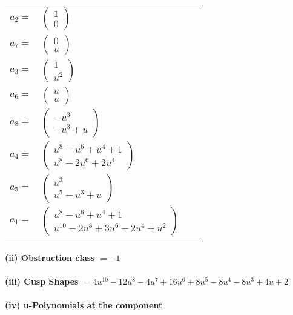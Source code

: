 \documentclass[1p]{elsarticle_modified}
\theoremstyle{definition}
\begin{document}
\begin{tabular}{m{7pt} m{180pt} m{7pt} m{180pt} }
\flushright $a_{2}=$&$\begin{pmatrix}1\\0\end{pmatrix}$ \\
\flushright $a_{7}=$&$\begin{pmatrix}0\\u\end{pmatrix}$ \\
\flushright $a_{3}=$&$\begin{pmatrix}1\\u^2\end{pmatrix}$ \\
\flushright $a_{6}=$&$\begin{pmatrix}u\\u\end{pmatrix}$ \\
\flushright $a_{8}=$&$\begin{pmatrix}- u^3\\- u^3+u\end{pmatrix}$ \\
\flushright $a_{4}=$&$\begin{pmatrix}u^8- u^6+u^4+1\\u^8-2 u^6+2 u^4\end{pmatrix}$ \\
\flushright $a_{5}=$&$\begin{pmatrix}u^3\\u^5- u^3+u\end{pmatrix}$ \\
\flushright $a_{1}=$&$\begin{pmatrix}u^8- u^6+u^4+1\\u^{10}-2 u^8+3 u^6-2 u^4+u^2\end{pmatrix}$\\&\end{tabular}
\flushleft \textbf{(ii) Obstruction class $= -1$}\\~\\
\flushleft \textbf{(iii) Cusp Shapes $= 4 u^{10}-12 u^8-4 u^7+16 u^6+8 u^5-8 u^4-8 u^3+4 u+2$}\\~\\
\newpage\renewcommand{\arraystretch}{1}
\flushleft \textbf{(iv) u-Polynomials at the component}\newline \\
\end{document}
